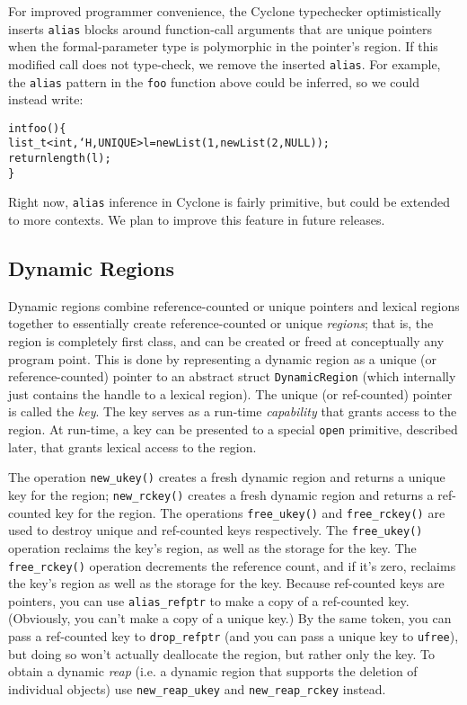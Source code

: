 For improved programmer convenience, the Cyclone typechecker
optimistically inserts \texttt{alias} blocks around function-call
arguments that are unique pointers when the formal-parameter type is
polymorphic in the pointer's region.  If this modified call does not
type-check, we remove the inserted \texttt{alias}.  For example, the
\texttt{alias} pattern in the \texttt{foo} function above could be
inferred, so we could instead write:
\begin{alltt}
  int foo() \{
    list\_t<int,`H,UNIQUE> l = new List(1,new List(2,NULL));
    return length(l);
  \}
\end{alltt}
Right now, \texttt{alias} inference in Cyclone is fairly primitive,
but could be extended to more contexts.  We plan to improve this
feature in future releases.


\subsection{Dynamic Regions}
\label{sec:dynamic-regions}

Dynamic regions combine reference-counted or unique pointers and lexical
regions together to essentially create reference-counted or unique
\emph{regions}; that is, the region is completely first class, and can be
created or freed at conceptually any program point.  This is done by
representing a dynamic region as a unique (or reference-counted) pointer to
an abstract struct \texttt{DynamicRegion} (which internally just contains
the handle to a lexical region).  The unique (or ref-counted) pointer is
called the \emph{key}.  The key serves as a run-time \emph{capability} that
grants access to the region.  At run-time, a key can be presented to a
special \texttt{open} primitive, described later, that grants lexical access
to the region.
        
The operation \texttt{new\_ukey()} creates a fresh dynamic region and
returns a unique key for the region; \texttt{new\_rckey()} creates a
fresh dynamic region and returns a ref-counted key for the region.
The operations \texttt{free\_ukey()} and \texttt{free\_rckey()} are
used to destroy unique and ref-counted keys respectively.  The
\texttt{free\_ukey()} operation reclaims the key's region, as well as
the storage for the key.  The \texttt{free\_rckey()} operation
decrements the reference count, and if it's zero, reclaims the key's
region as well as the storage for the key.  Because ref-counted keys
are pointers, you can use \texttt{alias\_refptr} to make a copy of a
ref-counted key.  (Obviously, you can't make a copy of a unique key.)
By the same token, you can pass a ref-counted key to
\texttt{drop\_refptr} (and you can pass a unique key to
\texttt{ufree}), but doing so won't actually deallocate the region,
but rather only the key. To obtain a dynamic \emph{reap} (i.e. a
dynamic region that supports the deletion of individual objects) use
\texttt{new\_reap\_ukey} and \texttt{new\_reap\_rckey} instead.

